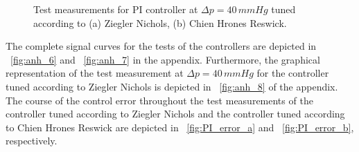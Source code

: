 \begin{figure}[ht]
  \centering
  \caption[Test measurements for PI controller at $\Delta{p}=40\,mmHg$]{Test measurements for PI controller at $\Delta{p}=40\,mmHg$ tuned according to (a) Ziegler Nichols, (b) Chien Hrones Reswick.}
  \label{fig:pi_contr_chr_zn}
\end{figure}
\newpage
The complete signal curves for the tests of the controllers are depicted in \figurename~\ref{fig:anh_6} and \figurename~\ref{fig:anh_7} in the appendix. Furthermore, the graphical representation of the test measurement at $\Delta{p}=40\,mmHg$ for the controller tuned according to Ziegler Nichols is depicted in \figurename~\ref{fig:anh_8} of the appendix.
\\The course of the control error throughout the test measurements of the controller tuned according to Ziegler Nichols and the controller tuned according to Chien Hrones Reswick are depicted in \figurename~\ref{fig:PI_error_a} and \figurename~\ref{fig:PI_error_b}, respectively.
